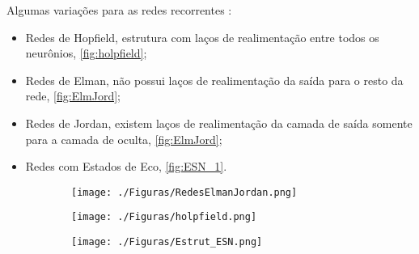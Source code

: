 Algumas variações para as redes recorrentes \cite{ibm2017}:
\begin{itemize}
	\item Redes de Hopfield, estrutura com laços de realimentação entre todos os neurônios, \autoref{fig:holpfield};
	\item Redes de Elman, não possui laços de realimentação da saída para o resto da rede, \autoref{fig:ElmJord};
	\item Redes de Jordan, existem laços de realimentação da camada de saída somente para a camada de oculta, \autoref{fig:ElmJord};
	\item Redes com Estados de Eco, \autoref{fig:ESN_1}.
\end{itemize}


\begin{figure}[H]
	\caption{Exemplos de redes recorrentes}
	\begin{subfigure}[t]{1\linewidth}
		\centering
		\label{fig:ElmJord}
		\texttt{[image: ./Figuras/RedesElmanJordan.png]}
	\end{subfigure}
	\begin{subfigure}[t]{.5\linewidth}
		\centering
		\label{fig:holpfield}
		\texttt{[image: ./Figuras/holpfield.png]}
	\end{subfigure}
	\begin{subfigure}[t]{.5\linewidth}
		\centering
		\label{fig:ESN_1}
		\texttt{[image: ./Figuras/Estrut\_ESN.png]}
	\end{subfigure}%
\end{figure}


